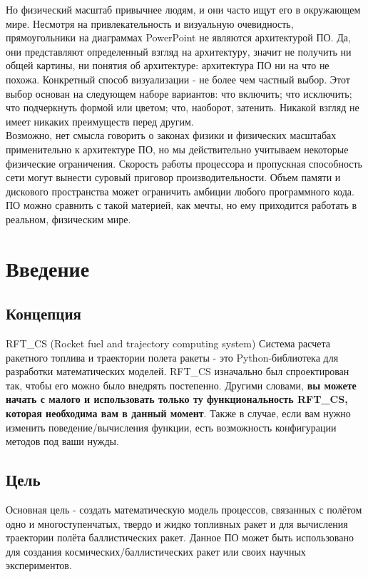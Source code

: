 \documentclass[a4paper, 12pt]{report}
\begin{document}
{    Но физический масштаб привычнее людям, и они часто ищут его в окружающем мире. Несмотря на привлекательность и визуальную очевидность, прямоугольники на диаграммах PowerPoint не являются архитектурой ПО. Да, они представляют определенный взгляд на архитектуру, значит не получить ни общей картины, ни понятия об архитектуре: архитектура ПО ни на что не похожа.
    Конкретный способ визуализации - не более чем частный выбор. Этот выбор основан на следующем наборе вариантов: что включить; что исключить; что подчеркнуть формой или цветом; что, наоборот, затенить. Никакой взгляд не имеет никаких преимуществ перед другим.\\
    Возможно, нет смысла говорить о законах физики и физических масштабах применительно к архитектуре ПО, но мы действительно учитываем некоторые физические ограничения. Скорость работы процессора и пропускная способность сети могут вынести суровый приговор производительности. Объем памяти и дискового пространства может ограничить амбиции любого программного кода. ПО можно сравнить с такой материей, как мечты, но ему приходится работать в реальном, физическим мире.\\
}

\chapter{Введение}
\section{Концепция}
\textrm{
    RFT\_CS (Rocket fuel and trajectory computing system) Система расчета ракетного топлива и траектории полета ракеты - это Python-библиотека для разработки математических моделей. RFT\_CS изначально был спроектирован так, чтобы его можно было внедрять постепенно. Другими словами, \textbf{вы можете начать с малого и использовать только ту функциональность RFT\_CS, которая необходима вам в данный момент}. Также в случае, если вам нужно изменить поведение/вычисления функции, есть возможность конфигурации методов под ваши нужды.
}
\section{Цель}
\textrm{
    Основная цель - создать математическую модель процессов, связанных с полётом одно и многоступенчатых, твердо и жидко топливных ракет и для вычисления траектории полёта баллистических ракет. Данное ПО может быть использовано для создания космических/баллистических ракет или своих научных экспериментов.
}
\end{document}
